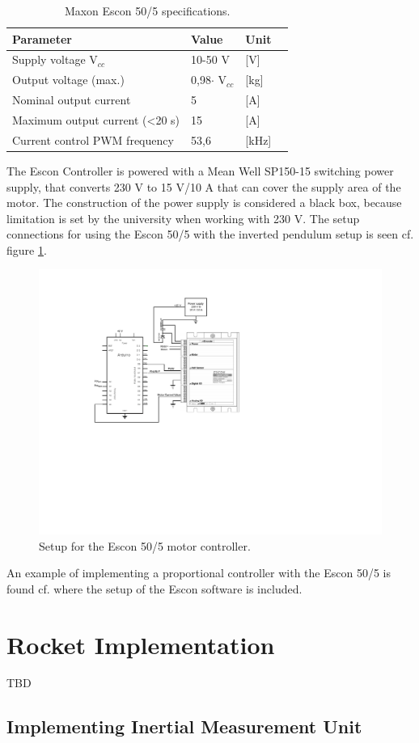 \begin{table}[htbp]
	\centering
	\begin{tabular}{llll}
	\hline
	Parameter & Value & Unit \\ \hline
	Supply voltage V$_{cc}$& 10-50 V & {[}V{]} \\
	Output voltage (max.) & 0,98$\cdot$ V$_{cc}$& {[}kg{]} \\
	Nominal output current & 5 & {[}A{]} \\
	Maximum output current (<20 s) & 15 & {[}A{]}\\
	Current control PWM frequency & 53,6 & {[}kHz{]}
	\end{tabular}
\caption{Maxon Escon 50/5 specifications.}
\label{MaxonSpecifications}
\end{table}
The Escon Controller is powered with a Mean Well SP150-15 switching power supply, that converts 230 V to 15 V/10 A that can cover the supply area of the motor. The construction of the power supply is considered a black box, because limitation is set by the university when working with 230 V. The setup connections for using the Escon 50/5 with the inverted pendulum setup is seen cf. figure \ref{fig:MaxonSetup}.  
\begin{figure}[htbp]
\centering
\includegraphics[width=1\textwidth]{figures/design/SetupMaxonDriver}
\caption{Setup for the Escon 50/5 motor controller.}
\label{fig:MaxonSetup}
\end{figure}
An example of implementing a proportional controller with the Escon 50/5 is found cf.  where the setup of the Escon software is included.
\newpage



\section{Rocket Implementation}
TBD

\subsection{Implementing Inertial Measurement Unit}